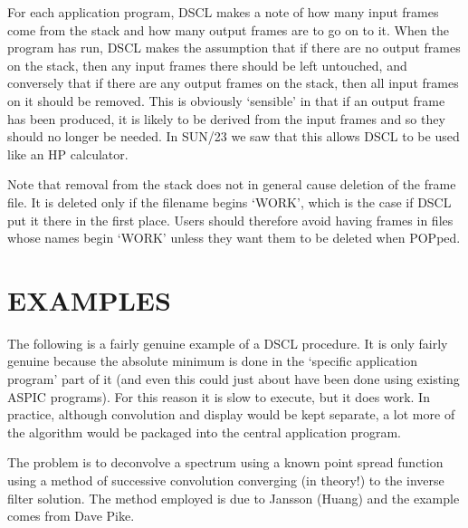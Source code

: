 For each application program, DSCL makes a note of how many input frames come
from the stack and how many output frames are to go on to it.
When the program has run, DSCL makes the assumption that if there are no output
frames on the stack, then any input frames there should be left untouched, and
conversely that if there are any output frames on the stack, then all input
frames on it should be removed.
This is obviously `sensible' in that if an output frame has been produced, it is
likely to be derived from the input frames and so they should no longer be
needed.
In SUN/23 we saw that this allows DSCL to be used like an HP calculator.

Note that removal from the stack does not in general cause deletion of the frame
file.
It is deleted only if the filename begins `WORK', which is the case if DSCL put
it there in the first place.
Users should therefore avoid having frames in files whose names begin `WORK'
unless they want them to be deleted when POPped.
\section {EXAMPLES}
The following is a fairly genuine example of a DSCL procedure.
It is only fairly genuine because the absolute minimum is done in the
`specific application program' part of it (and even this could just about have
been done using existing ASPIC programs).
For this reason it is slow to execute, but it does work.
In practice, although convolution and display would be kept separate, a lot more
of the algorithm would be packaged into the central application program.

The problem is to deconvolve a spectrum using a known point spread function
using a method of successive convolution converging (in theory!) to the inverse
filter solution.
The method employed is due to Jansson (Huang) and the example comes from Dave
Pike.

